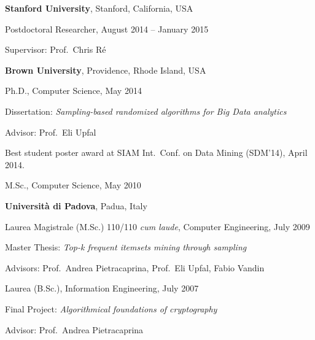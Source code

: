 \documentclass[margin,line]{resume}
\begin{document}
\begin{resume}
{\bf Stanford University}, Stanford, California, USA\\
\vspace*{-.18in}
\begin{list1}
\item[] Postdoctoral Researcher, August 2014 -- January 2015
\begin{list2}
\item Supervisor: Prof.~Chris R\'e
\end{list2}
\end{list1}

{\bf Brown University}, Providence, Rhode Island, USA\\
\vspace*{-.18in}
\begin{list1}
\item[] Ph.D., Computer Science, May 2014
\begin{list2}
\item Dissertation: {\em Sampling-based randomized algorithms for Big Data analytics}
\item Advisor: Prof.~Eli Upfal
\item Best student poster award at SIAM Int.~Conf. on Data Mining (SDM'14), April 2014.
\end{list2}
\item[] M.Sc., Computer Science, May 2010
\end{list1}

{\bf Universit\`a di Padova}, Padua, Italy\\
\vspace*{-.18in}
\begin{list1}
\item[] Laurea Magistrale (M.Sc.) 110/110 \textit{cum laude}, Computer Engineering, July 2009
\begin{list2}
\item Master Thesis: {\em Top-k frequent itemsets mining through sampling}
\item Advisors: Prof.~Andrea Pietracaprina, Prof.~Eli Upfal, Fabio Vandin
\end{list2}
\item[] Laurea (B.Sc.), Information Engineering, July 2007
\begin{list2}
\item Final Project: {\em Algorithmical foundations of cryptography}
\item Advisor: Prof.~Andrea Pietracaprina
\end{list2}
\end{list1}
\end{resume}
\end{document}
